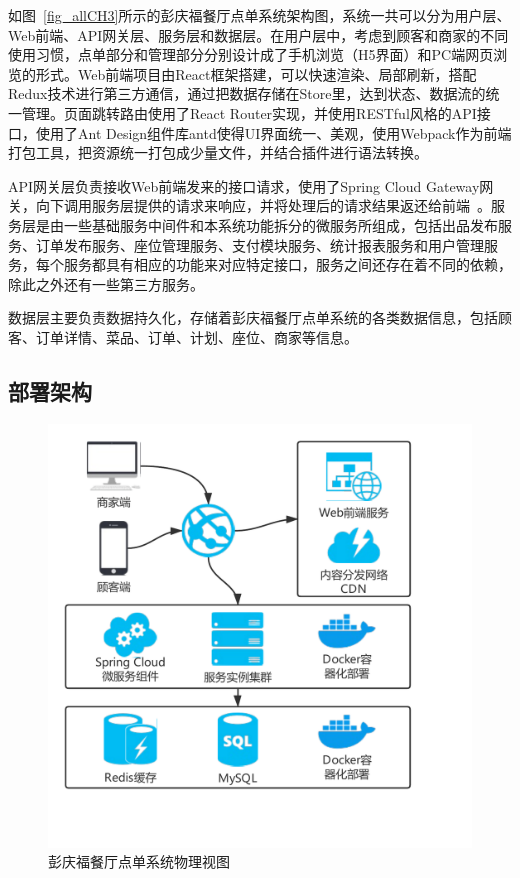 如图~\ref{fig_allCH3}所示的彭庆福餐厅点单系统架构图，系统一共可以分为用户层、Web前端、API网关层、服务层和数据层。在用户层中，考虑到顾客和商家的不同使用习惯，点单部分和管理部分分别设计成了手机浏览（H5界面）和PC端网页浏览的形式。Web前端项目由React框架搭建，可以快速渲染、局部刷新，搭配Redux技术进行第三方通信，通过把数据存储在Store里，达到状态、数据流的统一管理。页面跳转路由使用了React Router实现，并使用RESTful风格的API接口，使用了Ant Design组件库antd使得UI界面统一、美观，使用Webpack作为前端打包工具，把资源统一打包成少量文件，并结合插件进行语法转换。

API网关层负责接收Web前端发来的接口请求，使用了Spring Cloud Gateway网关，向下调用服务层提供的请求来响应，并将处理后的请求结果返还给前端~\cite{venugopal2017containerized}。服务层是由一些基础服务中间件和本系统功能拆分的微服务所组成，包括出品发布服务、订单发布服务、座位管理服务、支付模块服务、统计报表服务和用户管理服务，每个服务都具有相应的功能来对应特定接口，服务之间还存在着不同的依赖，除此之外还有一些第三方服务。

数据层主要负责数据持久化，存储着彭庆福餐厅点单系统的各类数据信息，包括顾客、订单详情、菜品、订单、计划、座位、商家等信息。\\

\subsection{部署架构}
\begin{figure}[htbp!]
  \centering
  \includegraphics[width=4.5in]{FIGs/chapter3/physics.pdf}
  \caption{彭庆福餐厅点单系统物理视图}\label{fig_physicsCH3}
\end{figure}

